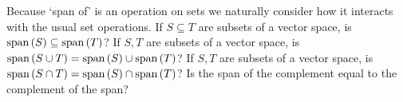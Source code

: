 
\begin{Exercise}[
name={},
title={}, 
difficulty=0,
origin={\cite{JH}}]
    Because `span of' is an operation on sets we naturally consider
    how it interacts with the usual set operations.
      \Question If \( S\subseteq T \) are subsets of a vector space, is
        \( \text{span}\left(S\right)\subseteq\text{span}\left(T\right) \)?
      \Question If \( S,T \) are subsets of a vector space, is
        \( \text{span}\left(S\cup T\right)=\text{span}\left(S\right)\cup\text{span}\left(T\right) \)?
      \Question If \( S,T \) are subsets of a vector space, is
        \( \text{span}\left(S\cap T\right)=\text{span}\left(S\right)\cap\text{span}\left(T\right) \)?
      \Question Is the span of the complement equal to the complement of
        the span?

\end{Exercise}

